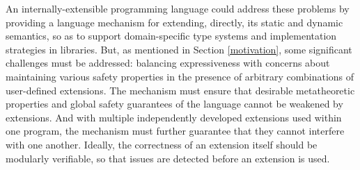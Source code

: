 %
%



An internally-extensible programming language could address these problems by providing a language mechanism for extending, directly, its static and dynamic semantics, so as to support domain-specific type systems and implementation strategies in libraries. 
But, as mentioned in Section \ref{motivation}, some significant challenges must be addressed: balancing  expressiveness with concerns about maintaining various safety properties in the presence of arbitrary combinations of user-defined  extensions. The mechanism must ensure that desirable metatheoretic properties and global safety guarantees of the language cannot be weakened by extensions. And with multiple independently developed extensions used within one program, the mechanism must further guarantee that they cannot interfere with one another. Ideally, the correctness of an extension itself should be modularly verifiable, so that issues are detected before an extension is used.

